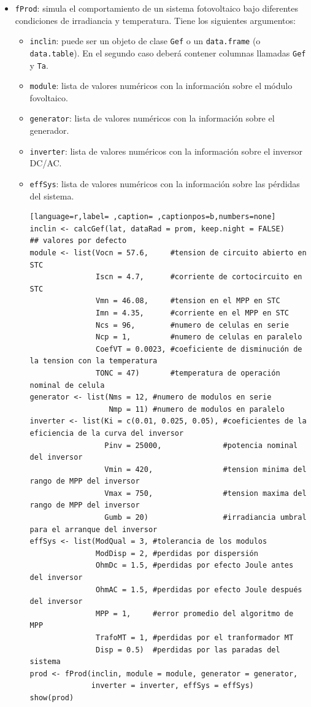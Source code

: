 \begin{itemize}
\item \texttt{fProd}: simula el comportamiento de un sistema fotovoltaico bajo diferentes condiciones de irradiancia y temperatura. Tiene los siguientes argumentos:
\begin{itemize}
\item \texttt{inclin}: puede ser un objeto de clase \texttt{Gef} o un \texttt{data.frame} (o \texttt{data.table}). En el segundo caso deberá contener columnas llamadas \texttt{Gef} y \texttt{Ta}.
\item \texttt{module}: lista de valores numéricos con la información sobre el módulo fovoltaico.
\item \texttt{generator}: lista de valores numéricos con la información sobre el generador.
\item \texttt{inverter}: lista de valores numéricos con la información sobre el inversor DC/AC.
\item \texttt{effSys}: lista de valores numéricos con la información sobre las pérdidas del sistema.
\begin{lstlisting}[language=r,label= ,caption= ,captionpos=b,numbers=none]
inclin <- calcGef(lat, dataRad = prom, keep.night = FALSE)
## valores por defecto
module <- list(Vocn = 57.6,     #tension de circuito abierto en STC
               Iscn = 4.7,      #corriente de cortocircuito en STC
               Vmn = 46.08,     #tension en el MPP en STC
               Imn = 4.35,      #corriente en el MPP en STC
               Ncs = 96,        #numero de celulas en serie
               Ncp = 1,         #numero de celulas en paralelo
               CoefVT = 0.0023, #coeficiente de disminución de la tension con la temperatura
               TONC = 47)       #temperatura de operación nominal de celula
generator <- list(Nms = 12, #numero de modulos en serie
                  Nmp = 11) #numero de modulos en paralelo
inverter <- list(Ki = c(0.01, 0.025, 0.05), #coeficientes de la eficiencia de la curva del inversor
                 Pinv = 25000,              #potencia nominal del inversor
                 Vmin = 420,                #tension minima del rango de MPP del inversor
                 Vmax = 750,                #tension maxima del rango de MPP del inversor
                 Gumb = 20)                 #irradiancia umbral para el arranque del inversor
effSys <- list(ModQual = 3, #tolerancia de los modulos
               ModDisp = 2, #perdidas por dispersión
               OhmDc = 1.5, #perdidas por efecto Joule antes del inversor
               OhmAC = 1.5, #perdidas por efecto Joule después del inversor
               MPP = 1,     #error promedio del algoritmo de MPP
               TrafoMT = 1, #perdidas por el tranformador MT
               Disp = 0.5)  #perdidas por las paradas del sistema
prod <- fProd(inclin, module = module, generator = generator,
              inverter = inverter, effSys = effSys)
show(prod)
\end{lstlisting}


\end{itemize}
\end{itemize}
